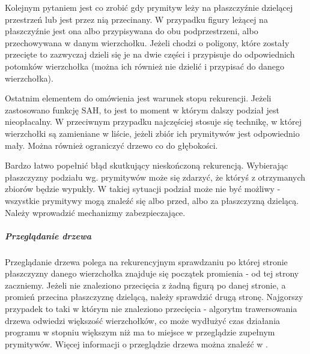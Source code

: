 Kolejnym pytaniem jest co zrobić gdy prymityw leży na płaszczyźnie dzielącej przestrzeń lub jest przez nią przecinany. W przypadku figury leżącej na płaszczyźnie jest ona albo przypisywana do obu podprzestrzeni, albo przechowywana w danym wierzchołku. Jeżeli chodzi o poligony, które zostały przecięte to zazwyczaj dzieli się je na dwie części i przypisuje do odpowiednich potomków wierzchołka (można ich również nie dzielić i przypisać do danego wierzchołka).

Ostatnim elementem do omówienia jest warunek stopu rekurencji. Jeżeli zastosowano funkcję SAH, to jest to moment w którym dalszy podział jest nieopłacalny. W przeciwnym przypadku najczęściej stosuje się technikę, w której wierzchołki są zamieniane w liście, jeżeli zbiór ich prymitywów jest odpowiednio mały. Można również ograniczyć drzewo co do głębokości. 

Bardzo łatwo popełnić błąd skutkujący nieskończoną rekurencją. Wybierając płaszczyzny podziału wg. prymitywów może się zdarzyć, że któryś z otrzymanych zbiorów będzie wypukły. W takiej sytuacji podział może nie być możliwy - wszystkie prymitywy mogą znaleźć się albo przed, albo za płaszczyzną dzielącą. Należy wprowadzić mechanizmy zabezpieczające.


\subparagraph{Przeglądanie drzewa}


Przeglądanie drzewa polega na rekurencyjnym sprawdzaniu po której stronie płaszczyzny danego wierzchołka znajduje się początek promienia - od tej strony zaczniemy. Jeżeli nie znaleziono przecięcia z żadną figurą po danej stronie, a promień przecina płaszczyznę dzielącą, należy sprawdzić drugą stronę. Najgorszy przypadek to taki w którym nie znaleziono przecięcia - algorytm trawersowania drzewa odwiedzi większość wierzchołków, co może wydłużyć czas działania programu w stopniu większym niż ma to miejsce w przeglądzie zupełnym prymitywów. Więcej informacji o przeglądzie drzewa można znaleźć w \cite{bspfaq, trees}.